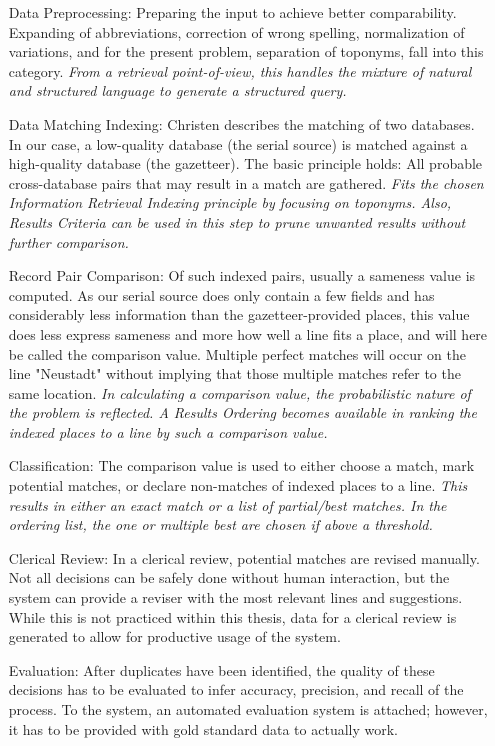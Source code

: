 \documentclass[11pt]{article}
\begin{document}
\begin{itemize}
\item [Data Preprocessing:] Preparing the input to achieve better comparability. Expanding of abbreviations, correction of wrong spelling, normalization of variations, and for the present problem, separation of toponyms, fall into this category. \emph{From a retrieval point-of-view, this handles the mixture of natural and structured language to generate a structured query.}

\item [Data Matching Indexing:] Christen describes the matching of two databases. In our case, a low-quality database (the serial source) is matched against a high-quality database (the gazetteer). The basic principle holds: All probable cross-database pairs that may result in a match are gathered. \emph{Fits the chosen Information Retrieval Indexing principle by focusing on toponyms. Also, Results Criteria can be used in this step to prune unwanted results without further comparison.}

\item [Record Pair Comparison:] Of such indexed pairs, usually a sameness value is computed. As our serial source does only contain a few fields and has considerably less information than the gazetteer-provided places, this value does less express sameness and more how well a line fits a place, and will here be called the comparison value. Multiple perfect matches will occur on the line "Neustadt" without implying that those multiple matches refer to the same location. \emph{In calculating a comparison value, the probabilistic nature of the problem is reflected. A Results Ordering becomes available in ranking the indexed places to a line by such a comparison value.}

\item [Classification:] The comparison value is used to either choose a match, mark potential matches, or declare non-matches of indexed places to a line. \emph{This results in either an exact match or a list of partial/best matches. In the ordering list, the one or multiple best are chosen if above a threshold.}

\item [Clerical Review:] In a clerical review, potential matches are revised manually. Not all decisions can be safely done without human interaction, but the system can provide a reviser with the most relevant lines and suggestions. While this is not practiced within this thesis, data for a clerical review is generated to allow for productive usage of the system.

\item [Evaluation:] After duplicates have been identified, the quality of these decisions has to be evaluated to infer accuracy, precision, and recall of the process. To the system, an automated evaluation system is attached; however, it has to be provided with gold standard data to actually work.
\end{itemize}
\end{document}
